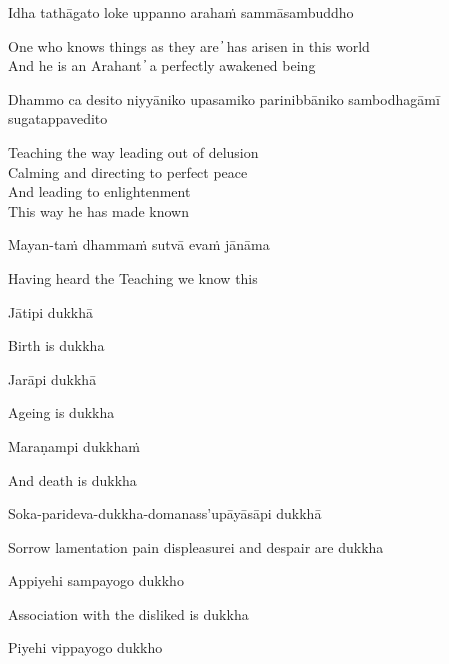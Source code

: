 Idha tathāgato loke uppanno arahaṁ sammāsambuddho

\begin{cprenglish}
  One who knows things as they are  ̓  has arisen in this world\\
  And he is an Arahant  ̓  a perfectly awakened being
\end{cprenglish}

Dhammo ca desito niyyāniko upasamiko parinibbāniko sambodhagāmī sugatappavedito

\begin{cprenglish}
  Teaching the way leading out of delusion\\
  Calming and directing to perfect peace\\
  And leading to enlightenment\\
  This way he has made known\\
\end{cprenglish}

Mayan-taṁ dhammaṁ sutvā evaṁ jānāma

\begin{cprenglish}
  Having heard the Teaching we know this
\end{cprenglish}

Jātipi dukkhā

\begin{cprenglish}
  Birth is dukkha
\end{cprenglish}

Jarāpi dukkhā

\begin{cprenglish}
  Ageing is dukkha
\end{cprenglish}

Maraṇampi dukkhaṁ

\begin{cprenglish}
  And death is dukkha
\end{cprenglish}

Soka-parideva-dukkha-domanass'upāyāsāpi dukkhā

\begin{cprenglish}
  Sorrow lamentation pain displeasurei and despair are dukkha
\end{cprenglish}

Appiyehi sampayogo dukkho

\begin{cprenglish}
  Association with the disliked is dukkha
\end{cprenglish}

Piyehi vippayogo dukkho

